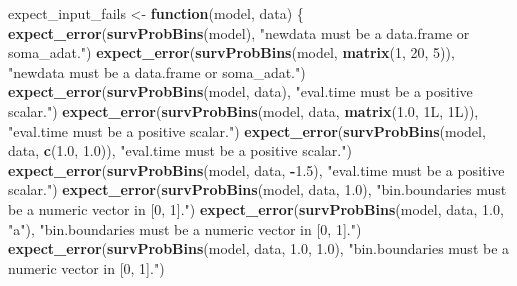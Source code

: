 \documentclass[
]{book}
\newenvironment{Shaded}{\begin{snugshade}}{\end{snugshade}}
\newcommand{\ControlFlowTok}[1]{\textcolor[rgb]{0.13,0.29,0.53}{\textbf{#1}}}
\newcommand{\DecValTok}[1]{\textcolor[rgb]{0.00,0.00,0.81}{#1}}
\newcommand{\FloatTok}[1]{\textcolor[rgb]{0.00,0.00,0.81}{#1}}
\newcommand{\FunctionTok}[1]{\textcolor[rgb]{0.13,0.29,0.53}{\textbf{#1}}}
\newcommand{\NormalTok}[1]{#1}
\newcommand{\OtherTok}[1]{\textcolor[rgb]{0.56,0.35,0.01}{#1}}
\newcommand{\SpecialCharTok}[1]{\textcolor[rgb]{0.81,0.36,0.00}{\textbf{#1}}}
\newcommand{\StringTok}[1]{\textcolor[rgb]{0.31,0.60,0.02}{#1}}
\begin{document}
\begin{Shaded}
\begin{Highlighting}[]
\NormalTok{expect\_input\_fails }\OtherTok{\textless{}{-}} \ControlFlowTok{function}\NormalTok{(model, data) \{}
  \FunctionTok{expect\_error}\NormalTok{(}\FunctionTok{survProbBins}\NormalTok{(model), }
               \StringTok{"\textasciigrave{}newdata\textasciigrave{} must be a data.frame or soma\_adat."}\NormalTok{)}
  \FunctionTok{expect\_error}\NormalTok{(}\FunctionTok{survProbBins}\NormalTok{(model, }\FunctionTok{matrix}\NormalTok{(}\DecValTok{1}\NormalTok{, }\DecValTok{20}\NormalTok{, }\DecValTok{5}\NormalTok{)),}
               \StringTok{"\textasciigrave{}newdata\textasciigrave{} must be a data.frame or soma\_adat."}\NormalTok{)}
  \FunctionTok{expect\_error}\NormalTok{(}\FunctionTok{survProbBins}\NormalTok{(model, data),}
               \StringTok{"\textasciigrave{}eval.time\textasciigrave{} must be a positive scalar."}\NormalTok{)}
  \FunctionTok{expect\_error}\NormalTok{(}\FunctionTok{survProbBins}\NormalTok{(model, data, }\FunctionTok{matrix}\NormalTok{(}\FloatTok{1.0}\NormalTok{, 1L, 1L)),}
               \StringTok{"\textasciigrave{}eval.time\textasciigrave{} must be a positive scalar."}\NormalTok{)}
  \FunctionTok{expect\_error}\NormalTok{(}\FunctionTok{survProbBins}\NormalTok{(model, data, }\FunctionTok{c}\NormalTok{(}\FloatTok{1.0}\NormalTok{, }\FloatTok{1.0}\NormalTok{)),}
               \StringTok{"\textasciigrave{}eval.time\textasciigrave{} must be a positive scalar."}\NormalTok{)}
  \FunctionTok{expect\_error}\NormalTok{(}\FunctionTok{survProbBins}\NormalTok{(model, data, }\SpecialCharTok{{-}}\FloatTok{1.5}\NormalTok{),}
               \StringTok{"\textasciigrave{}eval.time\textasciigrave{} must be a positive scalar."}\NormalTok{)}
  \FunctionTok{expect\_error}\NormalTok{(}\FunctionTok{survProbBins}\NormalTok{(model, data, }\FloatTok{1.0}\NormalTok{),}
               \StringTok{"\textasciigrave{}bin.boundaries\textasciigrave{} must be a numeric vector in [0, 1]."}\NormalTok{)}
  \FunctionTok{expect\_error}\NormalTok{(}\FunctionTok{survProbBins}\NormalTok{(model, data, }\FloatTok{1.0}\NormalTok{, }\StringTok{"a"}\NormalTok{),}
               \StringTok{"\textasciigrave{}bin.boundaries\textasciigrave{} must be a numeric vector in [0, 1]."}\NormalTok{)}
  \FunctionTok{expect\_error}\NormalTok{(}\FunctionTok{survProbBins}\NormalTok{(model, data, }\FloatTok{1.0}\NormalTok{, }\FloatTok{1.0}\NormalTok{),}
               \StringTok{"\textasciigrave{}bin.boundaries\textasciigrave{} must be a numeric vector in [0, 1]."}\NormalTok{)}

\end{Highlighting}
\end{Shaded}
\end{document}

